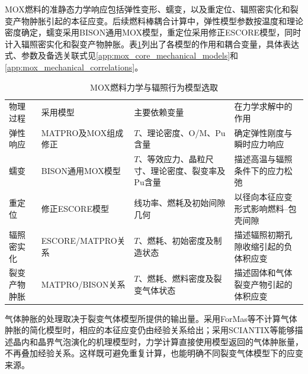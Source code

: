 \label{sec:mox_mechanical_properties}

MOX燃料的准静态力学响应包括弹性变形、蠕变，以及重定位、辐照密实化和裂变产物肿胀引起的本征应变。后续燃料棒耦合计算中，弹性模型参数按温度和理论密度确定，蠕变采用BISON通用MOX模型，重定位采用修正ESCORE模型，同时计入辐照密实化和裂变产物肿胀。表\ref{tab:ch3_mox_mechanical_selection}列出了各模型的作用和耦合变量，具体表达式、参数及备选关联式见\ref{app:mox_core_mechanical_models}和\ref{app:mox_mechanical_correlations}。

\begin{table}[htbp]
	\centering
	\caption{MOX燃料力学与辐照行为模型选取}
	\label{tab:ch3_mox_mechanical_selection}
	\begin{tabularx}{\textwidth}{@{}
			>{\centering\arraybackslash}m{2.4cm}
			>{\centering\arraybackslash}m{3.3cm}
			>{\centering\arraybackslash}X
			>{\centering\arraybackslash}X
			@{}}
		\toprule
		物理过程 & 采用模型 & 主要依赖变量 & 在力学求解中的作用 \\
		弹性响应 & MATPRO及MOX组成修正 & $T$、理论密度、O/M、Pu含量 & 确定弹性刚度与瞬时应力响应 \\
		蠕变 & BISON通用MOX模型\cite{halesBISONTheoryManual2016,MiletJNM1983} & $T$、等效应力、晶粒尺寸、理论密度、裂变率及Pu含量 & 描述高温与辐照条件下的应力松弛 \\
		重定位 & 修正ESCORE模型\cite{fancherESCOREEPRISteadystate1987,halesBISONTheoryManual2016} & 线功率、燃耗及初始间隙几何 & 以径向本征应变形式影响燃料--包壳间隙 \\
		辐照密实化 & ESCORE/MATPRO关系 & $T$、燃耗、初始密度及制造状态 & 描述辐照初期孔隙收缩引起的负体积应变 \\
		裂变产物肿胀 & MATPRO/BISON关系 & $T$、燃耗、燃料密度及裂变气体状态 & 描述固体和气体裂变产物引起的体积应变 \\
		\bottomrule
	\end{tabularx}
\end{table}

气体肿胀的处理取决于裂变气体模型所提供的输出量。采用ForMas等不计算气体肿胀的简化模型时，相应的本征应变仍由经验关系给出；采用SCIANTIX等能够描述晶内和晶界气泡演化的机理模型时，力学计算直接使用模型返回的气体肿胀量，不再叠加经验关系。这样既可避免重复计算，也能明确不同裂变气体模型下的应变来源。

\label{sec:cladding_incore_models}


